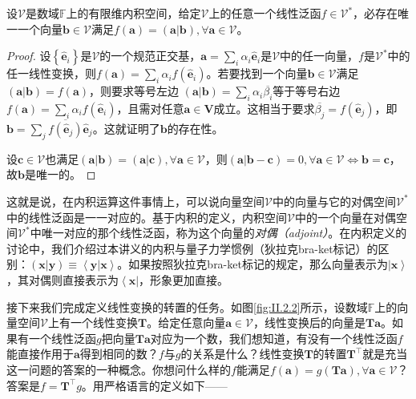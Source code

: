 \documentclass[main.tex]{subfiles}
\begin{document}
\begin{theorem}\label{thm:II.2.19}
    设$\mathcal{V}$是数域$\mathbb{F}$上的有限维内积空间，给定$\mathcal{V}$上的任意一个线性泛函$f\in\mathcal{V}^*$，必存在唯一一个向量$\mathbf{b}\in\mathcal{V}$满足$f\left(\mathbf{a}\right)=\left(\mathbf{a}|\mathbf{b}\right),\forall\mathbf{a}\in\mathcal{V}$。
\end{theorem}
\begin{proof}
    设$\left\{\mathbf{\hat{e}}_i\right\}$是$\mathcal{V}$的一个规范正交基，$\mathbf{a}=\sum_i\alpha_i\mathbf{\hat{e}}_i$是$\mathcal{V}$中的任一向量，$f$是$\mathcal{V}^*$中的任一线性变换，则$f\left(\mathbf{a}\right)=\sum_i\alpha_if\left(\mathbf{\hat{e}}_i\right)$。若要找到一个向量$\mathbf{b}\in\mathcal{V}$满足$\left(\mathbf{a}|\mathbf{b}\right)=f\left(\mathbf{a}\right)$，则要求等号左边
    $\left(\mathbf{a}|\mathbf{b}\right)=\sum_i\alpha_i\overline{\beta_i}$等于等号右边$f\left(\mathbf{a}\right)=\sum_i\alpha_if\left(\mathbf{\hat{e}}_i\right)$，且需对任意$\mathbf{a}\in\mathbf{V}$成立。这相当于要求$\overline{\beta_j}=f\left(\mathbf{\hat{e}}_j\right)$，即$\mathbf{b}=\sum_j\overline{f\left(\mathbf{\hat{e}}_j\right)}\mathbf{\hat{e}}_j$。这就证明了$\mathbf{b}$的存在性。

    设$\mathbf{c}\in\mathcal{V}$也满足$\left(\mathbf{a}|\mathbf{b}\right)=\left(\mathbf{a}|\mathbf{c}\right),\forall\mathbf{a}\in\mathcal{V}$，则$\left(\mathbf{a}|\mathbf{b}-\mathbf{c}\right)=0,\forall\mathbf{a}\in\mathcal{V}\Leftrightarrow\mathbf{b}=\mathbf{c}$，故$\mathbf{b}$是唯一的。
\end{proof}

这就是说，在内积运算这件事情上，可以说向量空间$\mathcal{V}$中的向量与它的对偶空间$\mathcal{V}^*$中的线性泛函是一一对应的。基于内积的定义，内积空间$\mathcal{V}$中的一个向量在对偶空间$\mathcal{V}^*$中唯一对应的那个线性泛函，称为这个向量的\emph{对偶（adjoint）}。在内积定义的讨论中，我们介绍过本讲义的内积与量子力学惯例（狄拉克bra-ket标记）的区别：$\left(\mathbf{x}|\mathbf{y}\right)\equiv\left\langle\mathbf{y}|\mathbf{x}\right\rangle$。如果按照狄拉克bra-ket标记的规定，那么向量表示为$\left|\mathbf{x}\right\rangle$，其对偶则直接表示为$\left\langle\mathbf{x}\right|$，形象更加直接。


接下来我们完成定义线性变换的转置的任务。如图\ref{fig:II.2.2}所示，设数域$\mathbb{F}$上的向量空间$\mathcal{V}$上有一个线性变换$\mathbf{T}$。给定任意向量$\mathbf{a}\in\mathcal{V}$，线性变换后的向量是$\mathbf{Ta}$。如果有一个线性泛函$g$把向量$\mathbf{Ta}$对应为一个数，我们想知道，有没有一个线性泛函$f$能直接作用于$\mathbf{a}$得到相同的数？$f$与$g$的关系是什么？线性变换$\mathbf{T}$的转置$\mathbf{T}^\intercal$就是充当这一问题的答案的一种概念。你想问什么样的$f$能满足$f\left(\mathbf{a}\right)=g\left(\mathbf{Ta}\right),\forall\mathbf{a}\in\mathcal{V}$？答案是$f=\mathbf{T}^\intercal g$。用严格语言的定义如下——
\end{document}
